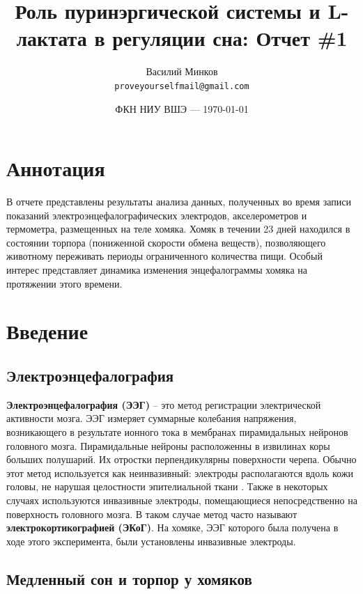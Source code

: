 \documentclass[12pt,a4paper,oneside]{article}
\title{Роль пуринэргической системы и L-лактата в регуляции сна: Отчет \#1} %
\author{Василий Минков\\ \texttt{proveyourselfmail@gmail.com}} %
\date{ФКН НИУ ВШЭ --- \today} %
\begin{document}
\maketitle %


\tableofcontents

\section{Аннотация}

В отчете представлены результаты анализа данных, полученных во время записи показаний электроэнцефалографических электродов, акселерометров и термометра, размещенных на теле хомяка. Хомяк в течении 23 дней находился в состоянии торпора (пониженной скорости обмена веществ), позволяющего животному переживать периоды ограниченного количества пищи. Особый интерес представляет динамика изменения энцефалограммы хомяка на протяжении этого времени.

\section{Введение}

\subsection{Электроэнцефалография}

\textbf{Электроэнцефалография (ЭЭГ)} -- это метод регистрации электрической активности мозга. ЭЭГ измеряет суммарные колебания напряжения, возникающего в результате ионного тока в мембранах пирамидальных нейронов головного мозга. Пирамидальные нейроны расположенны в извилинах коры больших полушарий. Их отростки перпендикулярны поверхности черепа. Обычно этот метод используется как неинвазивный: электроды располагаются вдоль кожи головы, не нарушая целостности эпителиальной ткани \cite{Luck2005}. Также в некоторых случаях используются инвазивные электроды, помещающиеся непосредственно на поверхность головного мозга. В таком случае метод часто называют \textbf{электрокортикографией (ЭКоГ)}. На хомяке, ЭЭГ которого была получена в ходе этого эксперимента, были установлены инвазивные электроды.

\subsection{Медленный сон и торпор у хомяков}
\end{document}
